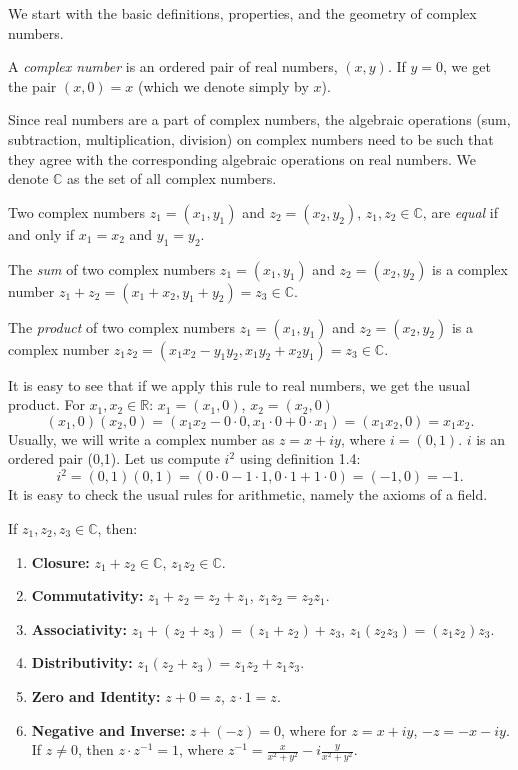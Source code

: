 \documentclass[12pt]{article}
\newcommand{\C}{\mathbb{C}}
\begin{document}
We start with the basic definitions, properties, and the geometry of complex numbers.

\begin{definition}
A \emph{complex number} is an ordered pair of real numbers, $(x, y)$.  If $y = 0$, we get the pair $(x, 0) = x$ (which we denote simply by $x$).
\end{definition}

Since real numbers are a part of complex numbers, the algebraic operations (sum, subtraction, multiplication, division) on complex numbers need to be such that they agree with the corresponding algebraic operations on real numbers.  We denote $\C$ as the set of all complex numbers.

\begin{definition}
Two complex numbers $z_1 = (x_1, y_1)$ and $z_2 = (x_2, y_2)$, $z_1, z_2 \in \C$, are \emph{equal} if and only if $x_1 = x_2$ and $y_1 = y_2$.
\end{definition}

\begin{definition}
The \emph{sum} of two complex numbers $z_1 = (x_1, y_1)$ and $z_2 = (x_2, y_2)$ is a complex number $z_1 + z_2 = (x_1 + x_2, y_1 + y_2) = z_3 \in \C$.
\end{definition}

\begin{definition}
The \emph{product} of two complex numbers $z_1 = (x_1, y_1)$ and $z_2 = (x_2, y_2)$ is a complex number $z_1 z_2 = (x_1 x_2 - y_1 y_2, x_1 y_2 + x_2 y_1) = z_3 \in \C$.
\end{definition}
It is easy to see that if we apply this rule to real numbers, we get the usual product.
For $x_1,x_2 \in \mathbb{R}$: $x_1=(x_1,0)$, $x_2=(x_2,0)$
\[ (x_1,0)(x_2,0) = (x_1x_2-0 \cdot 0, x_1 \cdot 0 + 0 \cdot x_1) = (x_1x_2,0) = x_1x_2. \]
Usually, we will write a complex number as $z=x+iy$, where $i=(0,1)$.  $i$ is an ordered pair (0,1).
Let us compute $i^2$ using definition 1.4:
\[ i^2 = (0,1)(0,1) = (0 \cdot 0 - 1 \cdot 1, 0 \cdot 1+ 1\cdot 0) = (-1,0) = -1. \]
It is easy to check the usual rules for arithmetic, namely the axioms of a field.

\begin{proposition}
If $z_1, z_2, z_3 \in \C$, then:
\begin{enumerate}
    \item \textbf{Closure:} $z_1 + z_2 \in \C$, $z_1 z_2 \in \C$.
    \item \textbf{Commutativity:} $z_1 + z_2 = z_2 + z_1$, $z_1 z_2 = z_2 z_1$.
    \item \textbf{Associativity:} $z_1 + (z_2 + z_3) = (z_1 + z_2) + z_3$, $z_1 (z_2 z_3) = (z_1 z_2) z_3$.
    \item \textbf{Distributivity:} $z_1 (z_2 + z_3) = z_1 z_2 + z_1 z_3$.
    \item \textbf{Zero and Identity:} $z + 0 = z$, $z \cdot 1 = z$.
    \item \textbf{Negative and Inverse:} $z + (-z) = 0$, where for $z = x + iy$, $-z = -x - iy$.  If $z \neq 0$, then $z \cdot z^{-1} = 1$, where $z^{-1} = \frac{x}{x^2 + y^2} - i \frac{y}{x^2 + y^2}$.
\end{enumerate}
\end{proposition}
\end{document}
